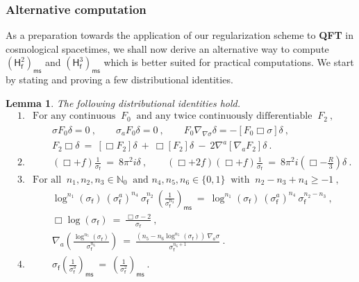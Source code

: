 \documentclass[12pt]{book}
\newcommand{\ms}{\mathsf{ms}}
\newcommand{\Nbb}{\mathbb{N}}
\newcommand{\Hsf}{\mathsf{H}}
\newcommand{\fsf}{\mathsf{f}}
\theoremstyle{break}
\newtheorem{lemma}{Lemma}
\begin{document}
\subsubsection{Alternative computation}


As a preparation towards the application of our regularization scheme to \textbf{QFT} in cosmological spacetimes, we shall now derive an alternative way to compute $\left(\Hsf_\fsf^2\right)_\ms$ and $\left(\Hsf_\fsf^3\right)_\ms$ which is better suited for practical computations. We start by stating and proving a few distributional identities.


\begin{lemma}\label{lem:product_identities}
The following distributional identities hold.
%
\begin{eqnarray*}
%
&1.& \mbox{For any continuous } \ F_0 \ \mbox{ and any twice continuously differentiable } \  F_2 \ , \\
&& \qquad \sigma F_0 \delta = 0 \ , \qquad \sigma_a F_0 \delta = 0 \ , \qquad F_0 \nabla_{\nabla\sigma} \delta = - [F_0 \Box \sigma] \delta \ ,  \\
&& \qquad F_2 \Box \delta \ = \ [\Box F_2]\delta \ + \ \Box [F_2]\delta \ - \ 2\nabla^a[\nabla_aF_2]\delta \ .\\
%
&2.& \qquad (\Box+f)\frac{1}{\sigma_\fsf} \ = \ 8\pi^2i\delta \ , \qquad (\Box+2f)(\Box+f)\frac{1}{\sigma_\fsf} \ = \ 8\pi^2i \left(\Box-\frac R3\right)\delta \ . \\
%
&3.& \mbox{For all } \ n_1, n_2, n_3 \in \Nbb_0 \ \mbox{ and } n_4, n_5, n_6 \in \{0,1\} \ \mbox{ with } \ n_2-n_3+n_4 \geq - 1 \ , \\
&& \qquad \log^{n_1}\left(\sigma_\fsf\right) \ (\sigma^a_\fsf)^{n_4} \ \sigma^{n_2}_\fsf \ \left(\frac{1}{\sigma_\fsf^{n_3}}\right)_\ms \ = \ \log^{n_1}\left(\sigma_\fsf\right) \ (\sigma^a_\fsf)^{n_4} \ \sigma^{n_2-n_3}_\fsf \ , \\
&& \qquad \Box \log(\sigma_\fsf) \ = \ \frac{\Box \sigma -2}{\sigma_\fsf} \ , \\
&& \qquad \nabla_a\left(\frac{\log^{n_5}(\sigma_\fsf)}{\sigma^{n_6}_\fsf}\right) \ = \ \frac{\left(n_5-n_6\log^{n_5}(\sigma_\fsf)\right) \ \nabla_a \sigma}{\sigma^{n_6+1}_\fsf} \ . \\
%
&4.& \qquad \sigma_\fsf\left(\frac{1}{\sigma_\fsf^3}\right)_\ms \ = \ \left(\frac{1}{\sigma_\fsf^2}\right)_\ms \ .
%
\end{eqnarray*}
%
\end{lemma}
\end{document}
